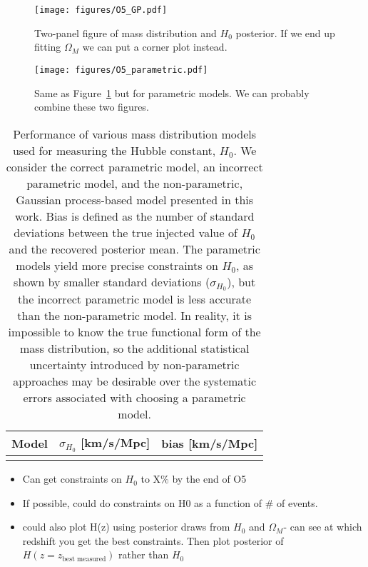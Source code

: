 \documentclass[]{aastex631}
\newcommand{\Ho}{$H_0$}
\newcommand{\Omm}{$\Omega_M$}
\begin{document}
\begin{figure}
    \centering
    \texttt{[image: figures/O5\_GP.pdf]}
    \caption{Two-panel figure of mass distribution and \Ho{} posterior. If we end up fitting \Omm{} we can put a corner plot instead.}
    \label{fig:O5_GP}
\end{figure}

\begin{figure}
    \centering
    \texttt{[image: figures/O5\_parametric.pdf]}
    \caption{Same as Figure~\ref{fig:O5_GP} but for parametric models. We can probably combine these two figures.}
    \label{fig:O5_parametric}
\end{figure}

\begin{table}[]
    \centering
    \begin{tabular}{c|c c}
         Model & $\sigma_{H_0}$ [km/s/Mpc] & bias [km/s/Mpc]\\
         \hline
         & 
    \end{tabular}
    \caption{Performance of various mass distribution models used for measuring the Hubble constant, \Ho.
    We consider the correct parametric model, an incorrect parametric model, and the non-parametric, Gaussian process-based model presented in this work.
    Bias is defined as the number of standard deviations between the true injected value of \Ho and the recovered posterior mean. 
    The parametric models yield more precise constraints on \Ho{}, as shown by smaller standard deviations ($\sigma_{H_0}$), but the incorrect parametric model is less accurate than the non-parametric model.
    In reality, it is impossible to know the true functional form of the mass distribution, so the additional statistical uncertainty introduced by non-parametric approaches may be desirable over the systematic errors associated with choosing a parametric model.
    }
    \label{tab:bias}
\end{table}

\begin{itemize}
    \item Can get constraints on \Ho{} to X\% by the end of O5
    \item If possible, could do constraints on H0 as a function of \# of events.
    \item could also plot H(z) using posterior draws from \Ho{} and \Omm{}- can see at which redshift you get the best constraints. Then plot posterior of $H(z=z_{\text{best measured}})$ rather than \Ho
\end{itemize}
\end{document}
